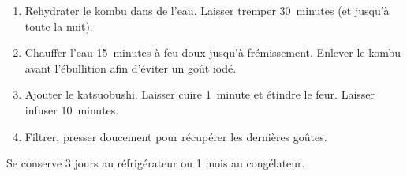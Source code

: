 
\begin{ingredients}
\end{ingredients}


\begin{recipe}
  \begin{enumerate}

  \item Rehydrater le kombu dans de l'eau.  Laisser tremper
    30~minutes (et jusqu'à toute la nuit).

  \item Chauffer l'eau 15~minutes à feu doux jusqu'à frémissement.
    Enlever le kombu avant l'ébullition afin d'éviter un goût iodé.

  \item Ajouter le katsuobushi.  Laisser cuire 1~minute et étindre le
    feur.  Laisser infuser 10~minutes.

  \item Filtrer, presser doucement pour récupérer les dernières goûtes.

  \end{enumerate}
\end{recipe}

Se conserve 3 jours au réfrigérateur ou 1 mois au congélateur.

